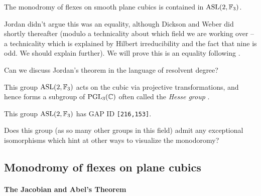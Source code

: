 \documentclass[11pt]{amsart}
\providecommand{\ASL}{\mathrm{ASL}}
\begin{document}
\begin{corollary} The monodromy of flexes on smooth plane cubics is contained in $\ASL(2,\F_3)$.
\end{corollary}

Jordan didn't argue this was an equality, although Dickson and Weber did shortly thereafter (modulo a technicality about which field we are working over -- a technicality which is explained by Hilbert irreducibility and the fact that nine is odd. We should explain further). We will prove this is an equality following \cite[\S~II.2]{Harris-Galois}.

\begin{question} Can we discuss Jordan's theorem in the language of resolvent degree?
\end{question}


\begin{note} This group $\ASL(2,\F_3)$ acts on the cubic via projective transformations, and hence forms a subgroup of $\mathrm{PGL}_3(\mathbb{C})$ often called the \textit{Hesse group} \cite[\S3.1.4]{Dolgachev}.
\end{note}

\begin{note} This group $\ASL(2,\F_3)$ has GAP ID \texttt{[216,153]}.
\end{note}

\begin{question} Does this group (as so many other groups in this field) admit any exceptional isomorphisms which hint at other ways to visualize the monodoromy?
\end{question}


\subsection{Monodromy of flexes on plane cubics}

\paragraph{\textbf{The Jacobian and Abel's Theorem}}
\end{document}
